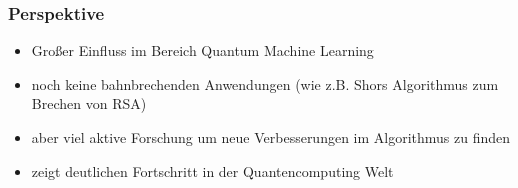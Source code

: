 \begin{frame}
    \frametitle{Perspektive}

    \begin{itemize}[<+->]
        \item  Großer Einfluss im Bereich Quantum Machine Learning 
        \item  noch keine bahnbrechenden Anwendungen (wie z.B. Shors Algorithmus zum Brechen von RSA)
        \item  aber viel aktive Forschung um neue Verbesserungen im Algorithmus zu finden
        \item  zeigt deutlichen Fortschritt in der Quantencomputing Welt
    \end{itemize}
    
\end{frame}

